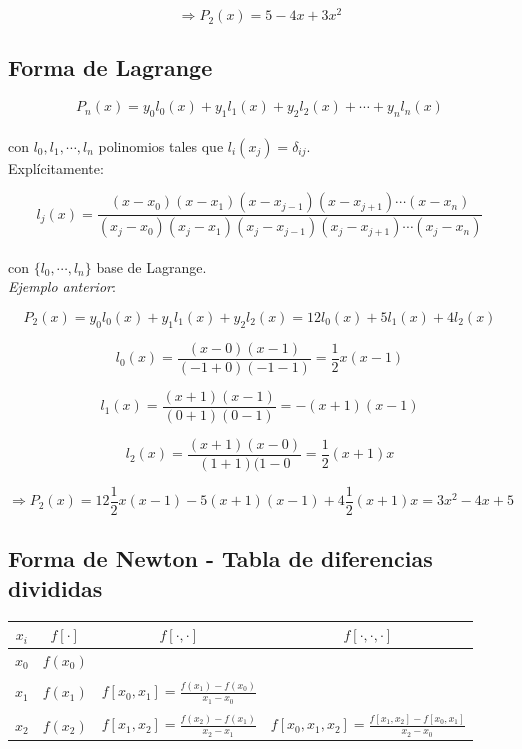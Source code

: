 $$ \Rightarrow P_{2}(x) = 5 - 4x + 3x^{2}$$

\subsection{Forma de Lagrange}

$$P_{n}(x) = y_{0}l_{0}(x) + y_{1}l_{1}(x) + y_{2}l_{2}(x) + \cdots + y_{n}l_{n}(x)$$\\

con $l_{0}, l_{1}, \cdots, l_{n}$ polinomios tales que $l_{i}(x_{j}) = \delta_{ij}$.\\

Expl\'icitamente:

$$l_{j}(x) = \frac{(x - x_{0})(x - x_{1})(x - x_{j - 1})(x - x_{j + 1})\cdots(x - x_{n})}{(x_{j} - x_{0})(x_{j} - x_{1})(x_{j} - x_{j - 1})(x_{j} - x_{j + 1})\cdots(x_{j} - x_{n})}$$\\

con $\{l_{0}, \cdots, l_{n}\}$ base de Lagrange.\\

\textit{Ejemplo anterior}:

$$P_{2}(x) = y_{0}l_{0}(x) + y_{1}l_{1}(x) + y_{2}l_{2}(x) = 12l_{0}(x) + 5l_{1}(x) + 4l_{2}(x)$$

$$l_{0}(x) = \frac{(x - 0)(x - 1)}{(-1 + 0)(-1 - 1)} = \frac{1}{2}x(x - 1)$$

$$l_{1}(x) = \frac{(x + 1)(x - 1)}{(0 + 1)(0 - 1)} = -(x + 1)(x - 1)$$

$$l_{2}(x) = \frac{(x + 1)(x - 0)}{(1 + 1)(1 - 0} = \frac{1}{2}(x + 1)x$$

$$\Rightarrow P_{2}(x) = 12\frac{1}{2}x(x - 1) - 5(x + 1)(x - 1) + 4\frac{1}{2}(x + 1)x = 3x^{2} - 4x + 5$$

\subsection{Forma de Newton - Tabla de diferencias divididas}

\begin{table}[h]
    \centering
    \begin{tabular}{c|ccc}
        $x_{i}$ & $f[\cdot]$ & $f[\cdot, \cdot]$ & $f[\cdot, \cdot, \cdot]$\\ \hline
        $x_{0}$ & $f(x_{0})$ &  & \\
        &&&\\
        $x_{1}$ & $f(x_{1})$ & $f[x_{0}, x_{1}] = \frac{f(x_{1}) - f(x_{0})}{x_{1} - x_{0}}$ & \\
        &&&\\
        $x_{2}$ & $f(x_{2})$ & $f[x_{1}, x_{2}] = \frac{f(x_{2}) - f(x_{1})}{x_{2} - x_{1}}$ & $f[x_{0}, x_{1}, x_{2}] = \frac{f[x_{1}, x_{2}] - f[x_{0}, x_{1}]}{x_{2} - x_{0}}$\\
    \end{tabular}
\end{table}

